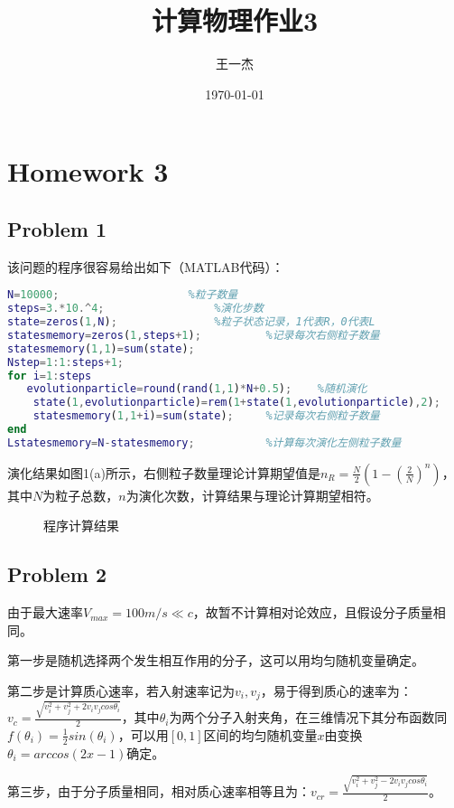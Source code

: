 \documentclass{article}
\title{计算物理作业3} %
\author[a]{王一杰} %
\affil[a]{中国科学技术大学}
\date{\today}%
\begin{document}
\maketitle

\section{Homework 3}
\subsection{Problem 1}
该问题的程序很容易给出如下（MATLAB代码）：
\begin{lstlisting}[language=MATLAB]
N=10000;					%粒子数量
steps=3.*10.^4;					%演化步数
state=zeros(1,N);				%粒子状态记录，1代表R，0代表L
statesmemory=zeros(1,steps+1);    		%记录每次右侧粒子数量
statesmemory(1,1)=sum(state);
Nstep=1:1:steps+1;
for i=1:steps
   evolutionparticle=round(rand(1,1)*N+0.5);	%随机演化
    state(1,evolutionparticle)=rem(1+state(1,evolutionparticle),2);
    statesmemory(1,1+i)=sum(state);		%记录每次右侧粒子数量
end
Lstatesmemory=N-statesmemory;			%计算每次演化左侧粒子数量
\end{lstlisting}
演化结果如图1(a)所示，右侧粒子数量理论计算期望值是$n_R=\frac{N}{2}(1-(\frac{2}{N})^{n})$，其中$N$为粒子总数，$n$为演化次数，计算结果与理论计算期望相符。
\begin{figure}[tbp]
 \caption{程序计算结果}
\end{figure}

\subsection{Problem 2}
由于最大速率$V_{max}=100m/s\ll c$，故暂不计算相对论效应，且假设分子质量相同。

第一步是随机选择两个发生相互作用的分子，这可以用均匀随机变量确定。

第二步是计算质心速率，若入射速率记为$v_i,v_j$，易于得到质心的速率为：$v_c=\frac{\sqrt{v_i^2+v_j^2+2v_iv_jcos\theta_i}}{2}$，其中$\theta_i$为两个分子入射夹角，在三维情况下其分布函数同$f(\theta_i)=\frac{1}{2}sin(\theta_i)$，可以用$[0,1]$区间的均匀随机变量$x$由变换$\theta_i=arccos(2x-1)$确定。

第三步，由于分子质量相同，相对质心速率相等且为：$v_{cr}=\frac{\sqrt{v_i^2+v_j^2-2v_iv_jcos\theta_i}}{2}$。
\end{document}
